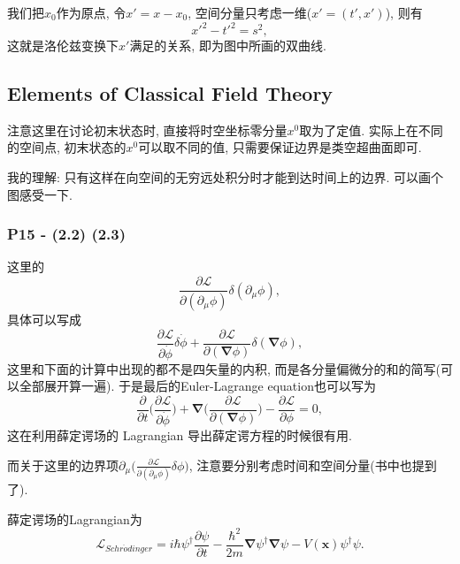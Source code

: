 \documentclass[cn,hazy,blue,11pt,device=normal,chinesefont=founder]{elegantnote}
\begin{document}
我们把$x_0$作为原点, 令$x'=x-x_0$, 空间分量只考虑一维($x'=(t',x')$), 则有
\begin{equation}
  x'^2-t'^2=s^2,
\end{equation}
这就是洛伦兹变换下$x'$满足的关系, 即为图中所画的双曲线. 

\subsection{Elements of Classical Field Theory}

注意这里在讨论初末状态时, 直接将时空坐标零分量$x^0$取为了定值. 实际上在不同的空间点, 初末状态的$x^0$可以取不同的值, 只需要保证边界是类空超曲面即可. 

\begin{remark}
  我的理解: 只有这样在向空间的无穷远处积分时才能到达时间上的边界. 可以画个图感受一下. 
\end{remark}

\subsubsection{P15 - (2.2) (2.3)}

这里的
\begin{equation}
  \frac{\partial \mathcal{L}}{\partial(\partial_\mu \phi)}\delta(\partial_\mu \phi),
\end{equation}
具体可以写成
\begin{equation}
  \frac{\partial \mathcal{L}}{\partial\dot\phi}\delta  \dot{\phi}+\frac{\partial \mathcal{L}}{\partial(\boldsymbol{\nabla} \phi)}\delta(\boldsymbol{\nabla} \phi),
\end{equation}
这里和下面的计算中出现的都不是四矢量的内积, 而是各分量偏微分的和的简写(可以全部展开算一遍). 于是最后的Euler-Lagrange equation也可以写为
\begin{equation}
  \frac{\partial}{\partial t}\biggl(\frac{\partial \mathcal{L}}{\partial\dot\phi}\biggr) + \boldsymbol{\nabla} \biggl(\frac{\partial \mathcal{L}}{\partial(\boldsymbol{\nabla} \phi)}\biggr) - \frac{\partial \mathcal{L}}{\partial \phi} = 0,
\end{equation}
这在利用薛定谔场的 Lagrangian 导出薛定谔方程的时候很有用. 

而关于这里的边界项$\partial_\mu \bigl(\frac{\partial \mathcal{L}}{\partial(\partial_\mu \phi)}\delta \phi \bigr)$, 注意要分别考虑时间和空间分量(书中也提到了). 

\begin{note}
  薛定谔场的Lagrangian为
  \begin{equation}
    \mathcal{L}_{Schr\ddot{o}dinger} = i\hbar\psi^\dagger\frac{\partial \psi}{\partial t} - \frac{\hbar^2}{2m}\boldsymbol{\nabla}\psi^\dagger\boldsymbol{\nabla}\psi - V(\mathbf x)\psi^\dagger\psi.
  \end{equation}
\end{note}
\end{document}

